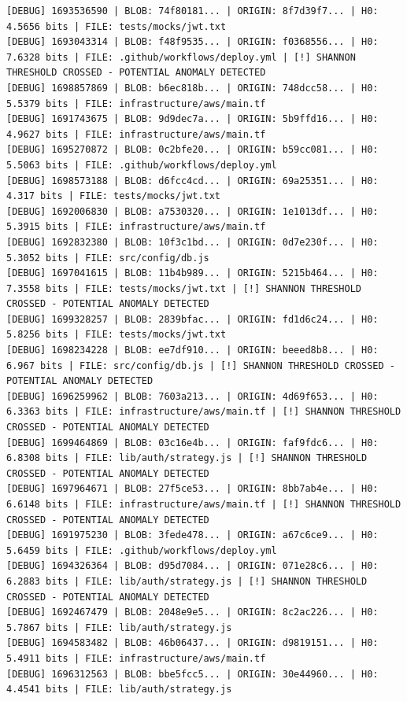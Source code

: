 \documentclass[12pt, a4paper, oneside]{report}
\begin{document}
\begin{lstlisting}[basicstyle=\tiny\ttfamily]
[DEBUG] 1693536590 | BLOB: 74f80181... | ORIGIN: 8f7d39f7... | H0: 4.5656 bits | FILE: tests/mocks/jwt.txt
[DEBUG] 1693043314 | BLOB: f48f9535... | ORIGIN: f0368556... | H0: 7.6328 bits | FILE: .github/workflows/deploy.yml | [!] SHANNON THRESHOLD CROSSED - POTENTIAL ANOMALY DETECTED
[DEBUG] 1698857869 | BLOB: b6ec818b... | ORIGIN: 748dcc58... | H0: 5.5379 bits | FILE: infrastructure/aws/main.tf
[DEBUG] 1691743675 | BLOB: 9d9dec7a... | ORIGIN: 5b9ffd16... | H0: 4.9627 bits | FILE: infrastructure/aws/main.tf
[DEBUG] 1695270872 | BLOB: 0c2bfe20... | ORIGIN: b59cc081... | H0: 5.5063 bits | FILE: .github/workflows/deploy.yml
[DEBUG] 1698573188 | BLOB: d6fcc4cd... | ORIGIN: 69a25351... | H0: 4.317 bits | FILE: tests/mocks/jwt.txt
[DEBUG] 1692006830 | BLOB: a7530320... | ORIGIN: 1e1013df... | H0: 5.3915 bits | FILE: infrastructure/aws/main.tf
[DEBUG] 1692832380 | BLOB: 10f3c1bd... | ORIGIN: 0d7e230f... | H0: 5.3052 bits | FILE: src/config/db.js
[DEBUG] 1697041615 | BLOB: 11b4b989... | ORIGIN: 5215b464... | H0: 7.3558 bits | FILE: tests/mocks/jwt.txt | [!] SHANNON THRESHOLD CROSSED - POTENTIAL ANOMALY DETECTED
[DEBUG] 1699328257 | BLOB: 2839bfac... | ORIGIN: fd1d6c24... | H0: 5.8256 bits | FILE: tests/mocks/jwt.txt
[DEBUG] 1698234228 | BLOB: ee7df910... | ORIGIN: beeed8b8... | H0: 6.967 bits | FILE: src/config/db.js | [!] SHANNON THRESHOLD CROSSED - POTENTIAL ANOMALY DETECTED
[DEBUG] 1696259962 | BLOB: 7603a213... | ORIGIN: 4d69f653... | H0: 6.3363 bits | FILE: infrastructure/aws/main.tf | [!] SHANNON THRESHOLD CROSSED - POTENTIAL ANOMALY DETECTED
[DEBUG] 1699464869 | BLOB: 03c16e4b... | ORIGIN: faf9fdc6... | H0: 6.8308 bits | FILE: lib/auth/strategy.js | [!] SHANNON THRESHOLD CROSSED - POTENTIAL ANOMALY DETECTED
[DEBUG] 1697964671 | BLOB: 27f5ce53... | ORIGIN: 8bb7ab4e... | H0: 6.6148 bits | FILE: infrastructure/aws/main.tf | [!] SHANNON THRESHOLD CROSSED - POTENTIAL ANOMALY DETECTED
[DEBUG] 1691975230 | BLOB: 3fede478... | ORIGIN: a67c6ce9... | H0: 5.6459 bits | FILE: .github/workflows/deploy.yml
[DEBUG] 1694326364 | BLOB: d95d7084... | ORIGIN: 071e28c6... | H0: 6.2883 bits | FILE: lib/auth/strategy.js | [!] SHANNON THRESHOLD CROSSED - POTENTIAL ANOMALY DETECTED
[DEBUG] 1692467479 | BLOB: 2048e9e5... | ORIGIN: 8c2ac226... | H0: 5.7867 bits | FILE: lib/auth/strategy.js
[DEBUG] 1694583482 | BLOB: 46b06437... | ORIGIN: d9819151... | H0: 5.4911 bits | FILE: infrastructure/aws/main.tf
[DEBUG] 1696312563 | BLOB: bbe5fcc5... | ORIGIN: 30e44960... | H0: 4.4541 bits | FILE: lib/auth/strategy.js

\end{lstlisting}
\end{document}
